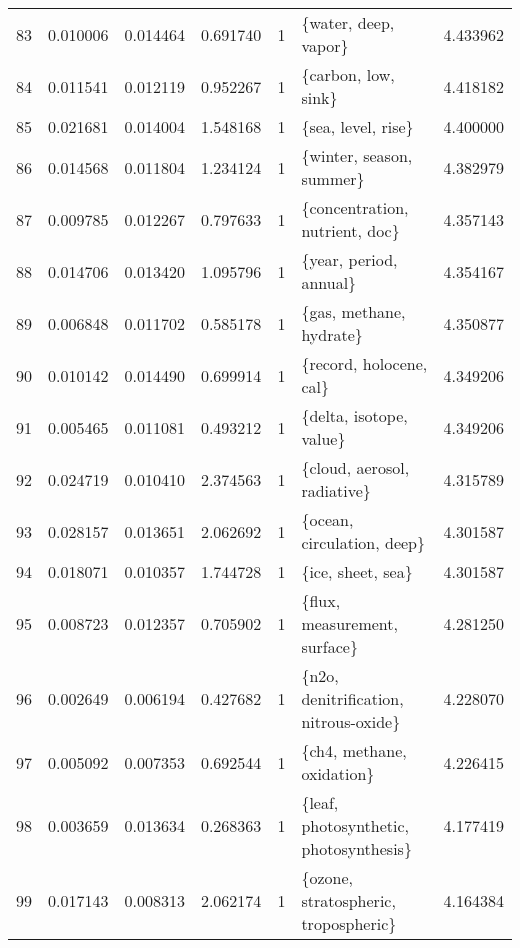 \begin{tabular}{lrrrrlr}
83 &    0.010006 &  0.014464 &        0.691740 &           1 &                    \{water, deep, vapor\} &  4.433962 \\
84 &    0.011541 &  0.012119 &        0.952267 &           1 &                     \{carbon, low, sink\} &  4.418182 \\
85 &    0.021681 &  0.014004 &        1.548168 &           1 &                      \{sea, level, rise\} &  4.400000 \\
86 &    0.014568 &  0.011804 &        1.234124 &           1 &                \{winter, season, summer\} &  4.382979 \\
87 &    0.009785 &  0.012267 &        0.797633 &           1 &          \{concentration, nutrient, doc\} &  4.357143 \\
88 &    0.014706 &  0.013420 &        1.095796 &           1 &                  \{year, period, annual\} &  4.354167 \\
89 &    0.006848 &  0.011702 &        0.585178 &           1 &                 \{gas, methane, hydrate\} &  4.350877 \\
90 &    0.010142 &  0.014490 &        0.699914 &           1 &                 \{record, holocene, cal\} &  4.349206 \\
91 &    0.005465 &  0.011081 &        0.493212 &           1 &                 \{delta, isotope, value\} &  4.349206 \\
92 &    0.024719 &  0.010410 &        2.374563 &           1 &             \{cloud, aerosol, radiative\} &  4.315789 \\
93 &    0.028157 &  0.013651 &        2.062692 &           1 &              \{ocean, circulation, deep\} &  4.301587 \\
94 &    0.018071 &  0.010357 &        1.744728 &           1 &                       \{ice, sheet, sea\} &  4.301587 \\
95 &    0.008723 &  0.012357 &        0.705902 &           1 &            \{flux, measurement, surface\} &  4.281250 \\
96 &    0.002649 &  0.006194 &        0.427682 &           1 &   \{n2o, denitrification, nitrous-oxide\} &  4.228070 \\
97 &    0.005092 &  0.007353 &        0.692544 &           1 &               \{ch4, methane, oxidation\} &  4.226415 \\
98 &    0.003659 &  0.013634 &        0.268363 &           1 &  \{leaf, photosynthetic, photosynthesis\} &  4.177419 \\
99 &    0.017143 &  0.008313 &        2.062174 &           1 &    \{ozone, stratospheric, tropospheric\} &  4.164384 \\
\bottomrule
\end{tabular}
